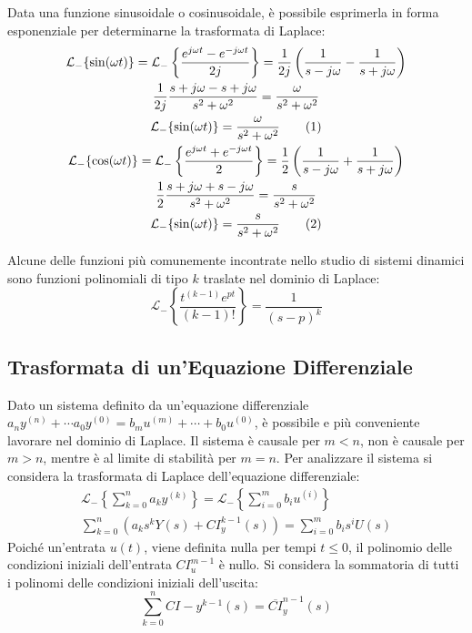 \documentclass{article}
\numberwithin{equation}{subsection}
\newcommand{\tageq}{\tag{\stepcounter{equation}\theequation}}
\begin{document}
Data una funzione sinusoidale o cosinusoidale, è possibile esprimerla in forma esponenziale per determinarne la trasformata di Laplace:
\begin{gather*}
    \mathcal{L}_-\{\sin(\omega t)\}=\mathcal{L}_-\left\{\displaystyle\frac{e^{j\omega t}-e^{-j\omega t}}{2j}\right\}=\frac{1}{2j}\left(\frac{1}{s-j\omega}-\frac{1}{s+j\omega}\right)\\
    \displaystyle\frac{1}{2j}\frac{s+j\omega-s+j\omega}{s^2+\omega^2}=\frac{\omega}{s^2+\omega^2}\\
    \mathcal{L}_-\{\sin(\omega t)\}=\displaystyle\frac{\omega}{s^2+\omega^2}\tageq\\
    \mathcal{L}_-\{\cos(\omega t)\}=\mathcal{L}_-\left\{\displaystyle\frac{e^{j\omega t}+e^{-j\omega t}}{2}\right\}=\frac{1}{2}\left(\frac{1}{s-j\omega}+\frac{1}{s+j\omega}\right)\\
    \displaystyle\frac{1}{2}\frac{s+j\omega+s-j\omega}{s^2+\omega^2}=\frac{s}{s^2+\omega^2}\\
    \mathcal{L}_-\{\sin(\omega t)\}=\displaystyle\frac{s}{s^2+\omega^2}\tageq
\end{gather*}

Alcune delle funzioni più comunemente incontrate nello studio di sistemi dinamici sono funzioni polinomiali di tipo $k$ traslate nel dominio di Laplace:
\begin{equation}
    \mathcal{L}_-\left\{\displaystyle\frac{t^{(k-1)}e^{pt}}{(k-1)!}\right\}=\frac{1}{(s-p)^k}
\end{equation}

\subsection{Trasformata di un'Equazione Differenziale}

Dato un sistema definito da un'equazione differenziale $a_ny^{(n)}+\cdots a_0y^{(0)}=b_mu^{(m)}+\cdots+b_0u^{(0)}$, è possibile e più conveniente lavorare nel dominio di 
Laplace. Il sistema è causale per $m<n$, non è causale per $m>n$, mentre è al limite di stabilità per $m=n$. Per analizzare il sistema si considera la trasformata di Laplace 
dell'equazione differenziale:
\begin{gather*}
    \mathcal{L}_-\left\{\displaystyle\sum_{k=0}^{n}a_ky^{(k)}\right\}=\mathcal{L}_-\left\{\sum_{i=0}^{m}b_iu^{(i)}\right\}\\
    \displaystyle\sum_{k=0}^{n}\left(a_ks^kY(s)+CI_y^{k-1}(s)\right)=\sum_{i=0}^{m}b_is^iU(s)
\end{gather*}
Poiché un'entrata $u(t)$, viene definita nulla per tempi $t\leq0$, il polinomio delle condizioni iniziali dell'entrata $CI_u^{m-1}$ è nullo. Si considera la sommatoria 
di tutti i polinomi delle condizioni iniziali dell'uscita:
\begin{equation*}
    \displaystyle\sum_{k=0}^{n}CI-y^{k-1}(s)=\overline{CI}_y^{n-1}(s)
\end{equation*}
\end{document}
